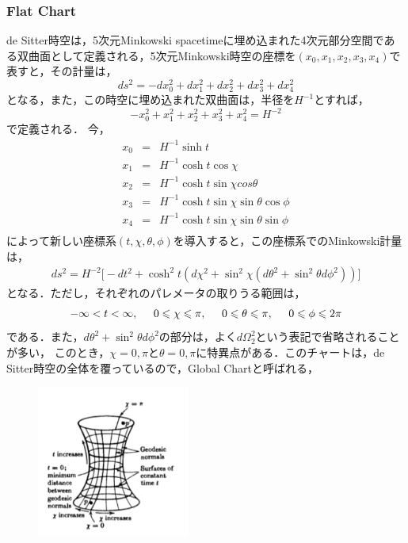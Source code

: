 \subsubsection{Flat Chart}
de Sitter時空は，5次元Minkowski spacetimeに埋め込まれた4次元部分空間である双曲面として定義される，5次元Minkowski時空の座標を$(x_0,x_1,x_2,x_3,x_4)$で表すと，その計量は，
\begin{equation}
  ds^2=-dx_0^2+dx_1^2+dx_2^2+dx_3^2+dx_4^2
\end{equation}
となる，また，この時空に埋め込まれた双曲面は，半径を$H^{-1}$とすれば，
\begin{equation}
  \label{1.2}
  -x_0^2+x_1^2+x_2^2+x_3^2+x_4^2=H^{-2}
\end{equation}
で定義される．
今，
\begin{eqnarray}
  x_0&=&H^{-1}\sinh{t} \\
  x_1&=&H^{-1}\cosh{t}\cos{\chi} \\
  x_2&=&H^{-1}\cosh{t}\sin{\chi}cos{\theta} \\
  x_3&=&H^{-1}\cosh{t}\sin{\chi}\sin{\theta}\cos{\phi} \\
  x_4&=&H^{-1}\cosh{t}\sin{\chi}\sin{\theta}\sin{\phi} \\
\end{eqnarray}
によって新しい座標系$(t,\chi,\theta,\phi)$を導入すると，この座標系でのMinkowski計量は，
\begin{eqnarray}
  ds^2=H^{-2}\biggr[-dt^2+\cosh^2{t}(d\chi^2+\sin^2\chi(d\theta^2+\sin^2\theta d\phi^2))\biggr]
\end{eqnarray}
となる．ただし，それぞれのパレメータの取りうる範囲は，
\begin{eqnarray}
  -\infty< t < \infty,\hspace{0.5cm} 0 \leqslant \chi \leqslant \pi,\hspace{0.5cm} 0 \leqslant \theta \leqslant \pi, \hspace{0.5cm} 0 \leqslant \phi \leqslant 2\pi
\end{eqnarray}である．また，$d\theta^2+\sin^2\theta d\phi^2$の部分は，よく$d\Omega_2^2$という表記で省略されることが多い，
このとき，$\chi=0,\pi$と$\theta=0,\pi$に特異点がある．このチャートは，de Sitter時空の全体を覆っているので，Global Chartと呼ばれる，
\begin{figure}[H]
\begin{center}
  \includegraphics[width=5cm,angle=0]{deSitter.pdf}
  　　　\caption{}
  　　\label{desitter}
\end{center}
\end{figure}

